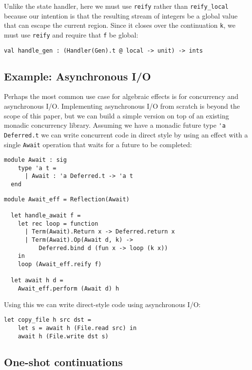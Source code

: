 \documentclass[acmsmall, screen, review, anonymous]{acmart}
\theoremstyle{definition}
\begin{document}
Unlike the state handler, here we must use
\lstinline[style=oxcaml]{reify} rather than
\lstinline[style=oxcaml]{reify_local} because our intention is that the
resulting stream of integers be a global value that can escape the
current region. Since it closes over the continuation
\lstinline[style=oxcaml]{k}, we must use \lstinline[style=oxcaml]{reify}
and require that \lstinline[style=oxcaml]{f} be global:
\begin{lstlisting}[style=oxcaml]
  val handle_gen : (Handler(Gen).t @ local -> unit) -> ints
\end{lstlisting}

\subsection{Example: Asynchronous I/O}

Perhaps the most common use case for algebraic effects is for
concurrency and asynchronous I/O. Implementing asynchronous I/O from
scratch is beyond the scope of this paper, but we can build a simple
version on top of an existing monadic concurrency library. Assuming we
have a monadic future type \lstinline[style=oxcaml]{'a Deferred.t} we can
write concurrent code in direct style by using an effect with a single
\lstinline[style=oxcaml]{Await} operation that waits for a future to be
completed:
\begin{lstlisting}[style=oxcaml]
  module Await : sig
    type 'a t =
      | Await : 'a Deferred.t -> 'a t
  end
\end{lstlisting}

\begin{lstlisting}[style=oxcaml]
  module Await_eff = Reflection(Await)

  let handle_await f =
    let rec loop = function
      | Term(Await).Return x -> Deferred.return x
      | Term(Await).Op(Await d, k) ->
          Deferred.bind d (fun x -> loop (k x))
    in
    loop (Await_eff.reify f)

  let await h d =
    Await_eff.perform (Await d) h
\end{lstlisting}

Using this we can write direct-style code using asynchronous I/O:
\begin{lstlisting}[style=oxcaml]
  let copy_file h src dst =
    let s = await h (File.read src) in
    await h (File.write dst s)
\end{lstlisting}

\subsection{One-shot continuations}
\end{document}

